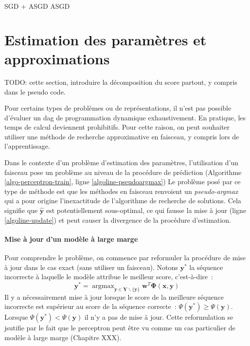 \documentclass[11pt,openany]{book}
\newcommand{\ac}[1]{{\sc #1}} %
\begin{document}
SGD + ASGD
ASGD

\section{Estimation des paramètres et approximations}

TODO: cette section, introduire la décomposition du score partout, y
compris dans le pseudo code.

Pour certains types de problèmes ou de représentations, il n'est pas
possible d'évaluer un \ac{dag} de programmation dynamique exhaustivement.
En pratique, les temps de calcul deviennent prohibitifs.
Pour cette raison, on peut souhaiter utiliser une méthode de recherche
approximative en faisceau, y compris lors de l'apprentissage.

Dans le contexte d'un problème d'estimation des paramètres,
l'utilisation d'un faisceau pose un problème au niveau de la procédure
de prédiction (Algorithme  \ref{algo-perceptron-train}, ligne \ref{algoline-pseudoargmax})
Le problème posé par ce type de méthode est que les méthodes en
faisceau renvoient un {\sl pseudo-argmax} qui a pour origine
l'inexactitude de l'algorithme de recherche de solutions.
Cela signifie que $\hat{\mathbf{y}}$ est potentiellement sous-optimal,
ce qui fausse la mise à jour (ligne \ref{algoline-update}) et peut
causer la divergence de la procédure d'estimation.

\paragraph{Mise à jour d'un modèle à large marge}
Pour comprendre le problème, on commence par reformuler la procédure 
de mise à jour dans le cas exact (sans utiliser un faisceau). Notons  $\mathbf{y}^*$ la séquence
incorrecte à laquelle le modèle attribue le meilleur score, c'est-à-dire~:
\begin{displaymath}
\mathbf{y}^* = \mathop{\text{argmax}}_{\mathbf{y} \in
  \mathbf{Y}\backslash \{\mathbf{y}\}} \mathbf{w}^T \boldsymbol\Phi(\mathbf{x},\mathbf{y})
\end{displaymath}
Il y a nécessairement mise à jour lorsque le score de la meilleure séquence
incorrecte est supérieur au score de la séquence correcte~: $\Psi(\mathbf{y}^*) \geq \Psi(\mathbf{y})$.
Lorsque $\Psi(\mathbf{y}^*) <\Psi(\mathbf{y})$ il n'y a pas de mise à
jour. Cette reformulation se jsutifie par le fait que le perceptron
peut être vu comme un cas particulier de modèle à large marge
(Chapitre XXX). 
\end{document}

